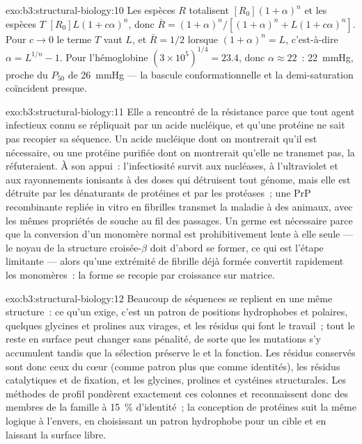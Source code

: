 \begin{solution}{exo:b3:structural-biology:10}
Les espèces $R$ totalisent $[R_{0}](1+\alpha)^{n}$ et les espèces $T$
$[R_{0}]L(1+c\alpha)^{n}$, donc $\bar R = (1+\alpha)^{n}/[(1+\alpha)^{n}
+ L(1+c\alpha)^{n}]$. Pour $c \to 0$ le terme $T$ vaut $L$, et $\bar R =
1/2$ lorsque $(1+\alpha)^{n} = L$, c'est-à-dire
$\alpha = L^{1/n} - 1$. Pour l'hémoglobine
$(3\times 10^{5})^{1/4} = 23.4$, donc $\alpha \approx 22$~:
\qty{22}{mmHg}, proche du $P_{50}$ de \qty{26}{mmHg} --- la bascule
conformationnelle et la demi-saturation coïncident presque.
\end{solution}

\begin{solution}{exo:b3:structural-biology:11}
Elle a rencontré de la résistance parce que tout agent infectieux connu
se répliquait par un acide nucléique, et qu'une protéine ne sait pas
recopier sa séquence. Un acide nucléique dont on montrerait qu'il est
nécessaire, ou une protéine purifiée dont on montrerait qu'elle ne
transmet pas, la réfuteraient. À son appui~: l'infectiosité survit aux
nucléases, à l'ultraviolet et aux rayonnements ionisants à des doses
qui détruisent tout génome, mais elle est détruite par les dénaturants
de protéines et par les protéases~; une PrP recombinante repliée in
vitro en fibrilles transmet la maladie à des animaux, avec les mêmes
propriétés de souche au fil des passages. Un germe est nécessaire parce
que la conversion d'un monomère normal est prohibitivement lente à elle
seule --- le noyau de la structure croisée-$\beta$ doit d'abord se
former, ce qui est l'étape limitante --- alors qu'une extrémité de
fibrille déjà formée convertit rapidement les monomères~: la forme se
recopie par croissance sur matrice.
\end{solution}

\begin{solution}{exo:b3:structural-biology:12}
Beaucoup de séquences se replient en une même structure~: ce qu'un
 exige, c'est un patron de positions hydrophobes et polaires,
quelques glycines et prolines aux virages, et les résidus qui font le
travail~; tout le reste en surface peut changer sans pénalité, de sorte
que les mutations s'y accumulent tandis que la sélection préserve le
 et la fonction. Les résidus conservés sont donc ceux du cœur
(comme patron plus que comme identités), les résidus catalytiques et de
fixation, et les glycines, prolines et cystéines structurales. Les
méthodes de profil pondèrent exactement ces colonnes et reconnaissent
donc des membres de la famille à \qty{15}{\%} d'identité~; la
conception de protéines suit la même logique à l'envers, en choisissant
un patron hydrophobe pour un  cible et en laissant la surface
libre.
\end{solution}

